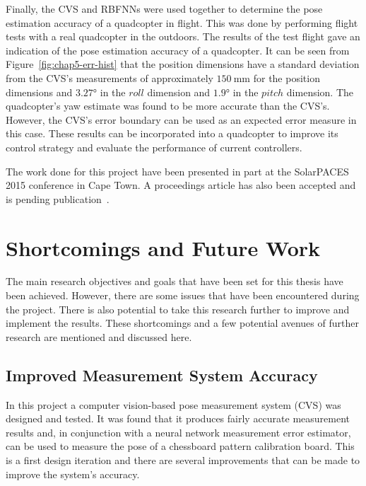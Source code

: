 Finally, the CVS and RBFNNs were used together to determine the pose estimation accuracy of a quadcopter in flight. This was done by performing flight tests with a real quadcopter in the outdoors. The results of the test flight gave an indication of the pose estimation accuracy of a quadcopter. It can be seen from Figure~\ref{fig:chap5-err-hist} that the position dimensions have a standard deviation from the CVS's measurements of approximately $\SI{150}{\mm}$ for the position dimensions and $\ang{3.27}$ in the $roll$ dimension and $\ang{1.9}$ in the $pitch$ dimension. The quadcopter's yaw estimate was found to be more accurate than the CVS's. However, the CVS's error boundary can be used as an expected error measure in this case. These results can be incorporated into a quadcopter to improve its control strategy and evaluate the performance of current controllers. 


The work done for this project have been presented in part at the SolarPACES 2015 conference in Cape Town. A proceedings article has also been accepted and is pending publication~\citep{lock2015}. 

\section{Shortcomings and Future Work}

The main research objectives and goals that have been set for this thesis have been achieved. However, there are some issues that have been encountered during the project. There is also potential to take this research further to improve and implement the results. These shortcomings and a few potential avenues of further research are mentioned and discussed here. 

\subsection{Improved Measurement System Accuracy}

In this project a computer vision-based pose measurement system (CVS) was designed and tested. It was found that it produces fairly accurate measurement results and, in conjunction with a neural network measurement error estimator, can be used to measure the pose of a chessboard pattern calibration board. This is a first design iteration and there are several improvements that can be made to improve the system's accuracy. 


